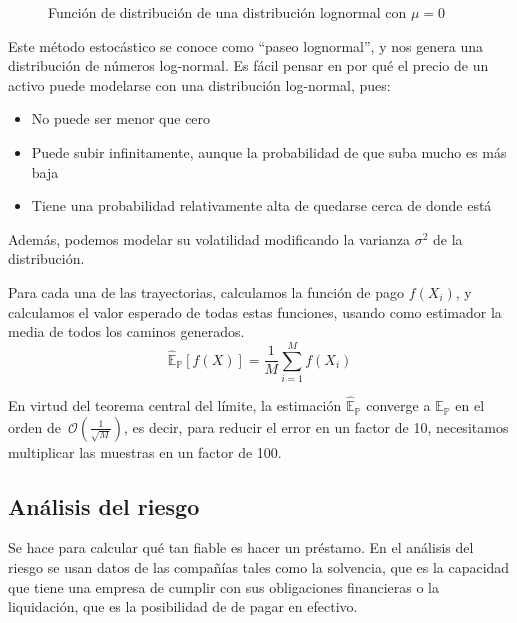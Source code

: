 \begin{figure}[h]
    \centering
    \caption{Función de distribución de una distribución lognormal con $\mu=0$}
\end{figure}

Este método estocástico se conoce como ``paseo lognormal'', y nos genera una distribución de números log-normal. Es fácil pensar en por qué el precio de un activo puede modelarse con una distribución log-normal, pues:
\begin{itemize}
    \item No puede ser menor que cero
    \item Puede subir infinitamente, aunque la probabilidad de que suba mucho es más baja
    \item Tiene una probabilidad relativamente alta de quedarse cerca de donde está
\end{itemize}

Además, podemos modelar su volatilidad modificando la varianza $\sigma^2$ de la distribución.

Para cada una de las trayectorias, calculamos la función de pago $f(X_i)$, y calculamos el valor esperado de todas estas funciones, usando como estimador la media de todos los caminos generados.
\begin{equation}
    \hat{\mathbb{E}}_\mathbb{P}\left[f\left(X\right)\right] = \frac{1}{M}\sum^M_{i=1}f\left(X_i\right)
\end{equation}

En virtud del teorema central del límite, la estimación $\hat{\mathbb{E}}_\mathbb{P}$ converge a $\mathbb{E}_\mathbb{P}$ en el orden de~$\mathcal{O}\left(\frac{1}{\sqrt{M}}\right)$, es decir, para reducir el error en un factor de 10, necesitamos multiplicar las muestras en un factor de 100.

\subsection{Análisis del riesgo}
Se hace para calcular qué tan fiable es hacer un préstamo. En el análisis del riesgo se usan datos de las compañías tales como la solvencia, que es la capacidad que tiene una empresa de cumplir con sus obligaciones financieras o la liquidación, que es la posibilidad de de pagar en efectivo. 